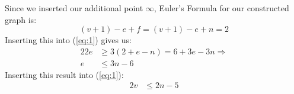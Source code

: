 \documentclass[10pt,a4paper,boxed]{hmcpset}
\begin{document}
\begin{solution}
\begin{enumerate}[(a)]
				Since we inserted our additional point $ \infty $, Euler's Formula for our constructed graph is:
				\[ (v+1)-e+f = (v+1)-e+n = 2 \]
				Inserting this into (\ref{eq:1}) gives us:
				\begin{alignat*}{2}
					2 e &\geq 3 (2 + e - n) = 6 + 3e - 3n \Rightarrow \\
					 e & \leq 3n - 6
				\end{alignat*}
				Inserting this result into (\ref{eq:1}):				
				\begin{alignat*}{2}
					v & \leq 2n - 5
				\end{alignat*}
				
									 
				
			\end{enumerate}
			
		\end{solution}		


	
\end{document}

